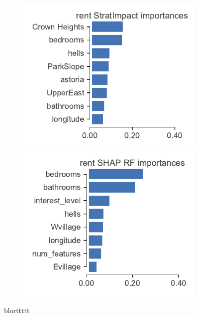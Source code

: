 \documentclass[12pt]{article}
\begin{document}
\begin{figure}
\begin{subfigure}{1\textwidth}
\vspace{-2mm}\vspace{3mm}
\end{subfigure}%
\hfill
\begin{subfigure}{1\textwidth}
    \centering
\includegraphics[scale=0.6]{images/rent-features.pdf}
\includegraphics[scale=0.6]{images/rent-features-shap-rf.pdf}
\vspace{-2mm}\vspace{3mm}
\end{subfigure}
\caption[short]{blorttttt}
\label{fig:features}
\end{figure}
\end{document}
